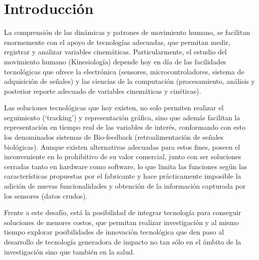 \documentclass[12pt,a4paper]{article}
\begin{document}
\thispagestyle{empty}
\tableofcontents %
\thispagestyle{empty}
\listoffigures
\thispagestyle{empty}
\newpage
\listoftables

\thispagestyle{empty}
\pagebreak
\setcounter{page}{1}

\let\stdsection\section
\renewcommand\section{\newpage\stdsection}

\section{Introducción}
La comprensión de las dinámicas y patrones de movimiento humano, se facilitan enormemente con el apoyo de tecnologías adecuadas, que permitan medir, registrar y analizar variables cinemáticas. Particularmente, el estudio del movimiento humano (Kinesiología) depende hoy en día de las facilidades tecnológicas que ofrece la electrónica (sensores, microcontroladores, sistema de adquisición de señales) y las ciencias de la computación (procesamiento, análisis y posterior reporte adecuado de  variables cinemáticas y cinéticas).  

Las soluciones tecnológicas que hoy existen, no solo permiten realizar el seguimiento (‘tracking’) y representación gráfica, sino que además facilitan la representación en tiempo real de las variables de interés, conformando con esto los denominados sistemas de Bio-feedback (retroalimentación de señales biológicas). Aunque existen alternativas adecuadas para estos fines, poseen el inconveniente en lo prohibitivo de su valor comercial, junto con ser soluciones cerradas tanto en hardware como software, lo que limita las funciones según las características propuestas por el fabricante y hace prácticamente imposible la adición de nuevas funcionalidades y obtención de la información capturada por los sensores (datos crudos).

Frente a este desafío, está la posibilidad de integrar tecnología para conseguir soluciones de menores costos, que permitan realizar investigación y al mismo tiempo explorar posibilidades de innovación tecnológica que den paso al desarrollo de tecnología generadora de impacto no tan sólo en el ámbito de la investigación sino que también en la salud.
\end{document}

